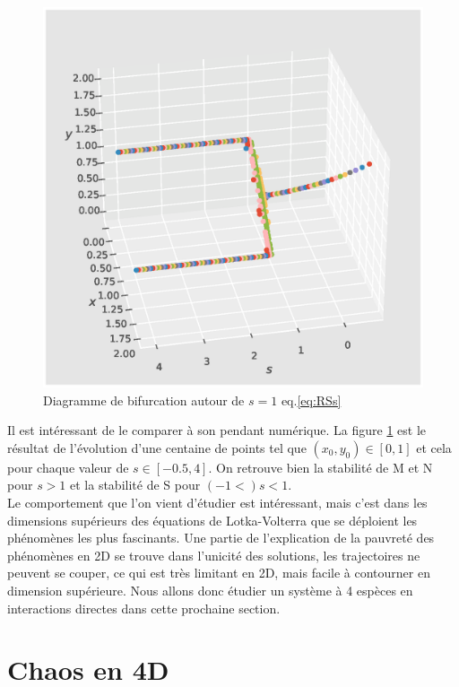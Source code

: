 \documentclass{wsdcr}
\begin{document}
\begin{figure}
    \centering
    \includegraphics[width=\linewidth]{fig/lv2_bif3Dx10.eps}
    \caption{Diagramme de bifurcation autour de $s=1$ eq.\ref{eq:RSs}}
    \label{fig:bif2}
\end{figure}
Il est intéressant de le comparer à son pendant numérique. La figure \ref{fig:bif2} est le résultat de l'évolution d'une centaine de points tel que $(x_0,y_0) \in [0,1]$ et cela pour chaque valeur de $s \in [-0.5,4]$. On retrouve bien la stabilité de M et N pour $s > 1$ et la stabilité de S pour $(-1<)s<1$. \\
Le comportement que l'on vient d'étudier est intéressant, mais c'est dans les dimensions supérieurs des équations de Lotka-Volterra que se déploient les phénomènes les plus fascinants. Une partie de l'explication de la pauvreté des phénomènes en 2D se trouve dans l'unicité des solutions, les trajectoires ne peuvent se couper, ce qui est très limitant en 2D, mais facile à contourner en dimension supérieure. Nous allons donc étudier un système à 4 espèces en interactions directes dans cette prochaine section.
\section{Chaos en 4D}
\end{document}
